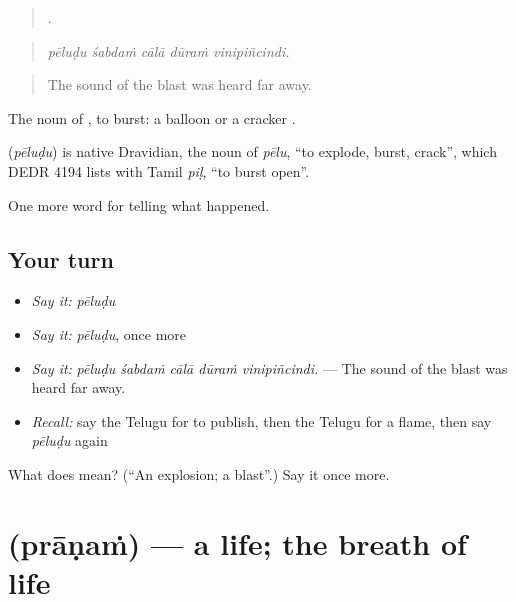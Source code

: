 \begin{quote}
    .
\end{quote}

\begin{quote}
\emph{pēluḍu śabdaṁ cālā dūraṁ vinipiñcindi.}
\end{quote}

\begin{quote}
The sound of the blast was heard far away.
\end{quote}

The noun of , to burst: a balloon or a cracker .

\begin{cousinweb}
\textbf{} (\emph{pēluḍu}) is native Dravidian, the noun of \emph{pēlu}, \textquotedblleft{}to explode, burst, crack\textquotedblright{}, which DEDR 4194 lists with Tamil \emph{piḷ}, \textquotedblleft{}to burst open\textquotedblright{}.
\end{cousinweb}

\begin{grammarlens}[title={What you've built}]
One more word for telling what happened.
\end{grammarlens}

\subsection*{Your turn}
\begin{itemize}
\raggedright
  \item \emph{Say it:} \emph{pēluḍu}
  \item \emph{Say it:} \emph{pēluḍu}, once more
  \item \emph{Say it:} \emph{pēluḍu śabdaṁ cālā dūraṁ vinipiñcindi.} — The sound of the blast was heard far away.
  \item \emph{Recall:} say the Telugu for to publish, then the Telugu for a flame, then say \emph{pēluḍu} again
\end{itemize}

\begin{tcolorbox}[breakable,colback=teal!4,colframe=teal!35!black,title={Before you move on}]
What does  mean? (\textquotedblleft{}An explosion; a blast\textquotedblright{}.) Say it once more.
\end{tcolorbox}
\section[\texorpdfstring{\te{ప్రాణం} (prāṇaṁ)}{ప్రాణం (prāṇaṁ)}]{ (prāṇaṁ) — a life; the breath of life}

